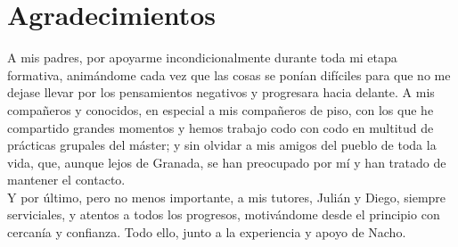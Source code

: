 

\chapter*{Agradecimientos}

A mis padres, por apoyarme incondicionalmente durante toda mi etapa formativa, animándome cada vez que las cosas se ponían difíciles para que no me dejase llevar por los pensamientos negativos y progresara hacia delante. A mis compañeros y conocidos, en especial a mis compañeros de piso, con los que he compartido grandes momentos y hemos trabajo codo con codo en multitud de prácticas grupales del máster; y sin olvidar a mis amigos del pueblo de toda la vida, que, aunque lejos de Granada, se han preocupado por mí y han tratado de mantener el contacto.\\

Y por último, pero no menos importante, a mis tutores, Julián y Diego, siempre serviciales, y atentos a todos los progresos, motivándome desde el principio con cercanía y confianza. Todo ello, junto a la experiencia y apoyo de Nacho.

\cleardoublepage
\endinput

